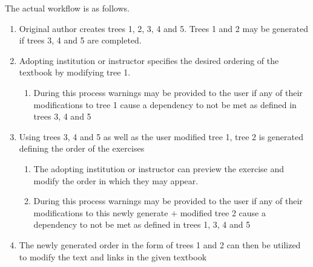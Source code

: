 The actual workflow is as follows.

\begin{enumerate}
    \item Original author creates trees 1, 2, 3, 4 and 5. Trees 1 and 2 may be generated if trees 3, 4 and 5 are completed.
    \item Adopting institution or instructor specifies the desired ordering of the textbook by modifying tree 1.
        \begin{enumerate}
            \item During this process warnings may be provided to the user if any of their modifications to tree 1 cause a dependency to not be met as defined in trees 3, 4 and 5
        \end{enumerate}
    \item Using trees 3, 4 and 5 as well as the user modified tree 1, tree 2 is generated defining the order of the exercises
        \begin{enumerate}
            \item The adopting institution or instructor can preview the exercise and modify the order in which they may appear.
            \item During this process warnings may be provided to the user if any of their modifications to this newly generate $+$ modified tree 2 cause a dependency to not be met as defined in trees 1, 3, 4 and 5
        \end{enumerate}
    \item The newly generated order in the form of trees 1 and 2 can then be utilized to modify the text and links in the given textbook
\end{enumerate}
